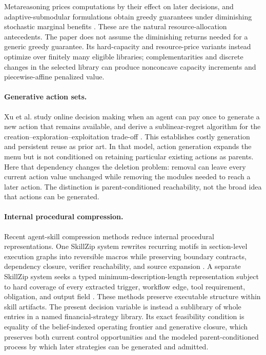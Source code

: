 Metareasoning prices computations by their effect on later decisions, and
adaptive-submodular formulations obtain greedy guarantees under diminishing
stochastic marginal benefits
\cite{RussellWefald1991,HayEtAl2012,GolovinKrause2011}.  These are the natural
resource-allocation antecedents.  The paper does not assume the diminishing
returns needed for a generic greedy guarantee.  Its hard-capacity and
resource-price variants instead optimize over finitely many eligible
libraries; complementarities and discrete changes in the selected library
can produce nonconcave capacity increments and piecewise-affine penalized
value.

\paragraph{Generative action sets.}
Xu et al. study online decision making when an agent can pay once to generate
a new action that remains available, and derive a sublinear-regret algorithm
for the creation--exploration--exploitation trade-off
\cite{XuEtAl2026GenerativeActions}.  This establishes costly generation and
persistent reuse as prior art.  In that model, action generation expands the
menu but is not conditioned on retaining particular existing actions as
parents.  Here that dependency changes the deletion problem: removal can
leave every current action value unchanged while removing the modules needed
to reach a later action.  The distinction is parent-conditioned reachability,
not the broad idea that actions can be generated.

\paragraph{Internal procedural compression.}
Recent agent-skill compression methods reduce internal procedural
representations.  One SkillZip system rewrites recurring motifs in
section-level execution graphs into reversible macros while preserving
boundary contracts, dependency closure, verifier reachability, and source
expansion \cite{TanEtAl2026SkillZipGraph}.  A separate SkillZip system seeks a
typed minimum-description-length representation subject to hard coverage of
every extracted trigger, workflow edge, tool requirement, obligation, and
output field \cite{BaiEtAl2026SkillZipMDL}.  These methods preserve executable
structure within skill artifacts.  The present decision variable is instead a
sublibrary of whole entries in a named financial-strategy library.  Its exact
feasibility condition is equality of the belief-indexed operating frontier
and generative closure, which preserves both current control opportunities
and the modeled parent-conditioned process by which later strategies can be
generated and admitted.


